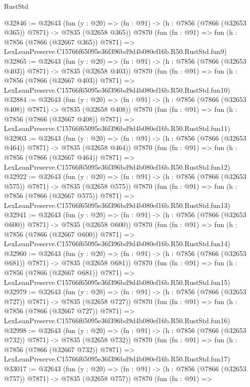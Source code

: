 \begin{lexlean}{RustStd}
\begin{coremodule}
@32846 := @32643
    (fun (y : @20) => (fn : @91) -> (h : @7856 (@7866 (@32653 @365)) @7871) -> @7835 (@32658 @365))
    @7870
    (fun (fn : @91) =>
    fun (h : @7856 (@7866 (@32667 @365)) @7871) =>
    LexLeanPreserve.C15766f65095e36f396bd9d4b080ef16b.R50.RustStd.fun9)
@32865 := @32643
    (fun (y : @20) => (fn : @91) -> (h : @7856 (@7866 (@32653 @403)) @7871) -> @7835 (@32658 @403))
    @7870
    (fun (fn : @91) =>
    fun (h : @7856 (@7866 (@32667 @403)) @7871) =>
    LexLeanPreserve.C15766f65095e36f396bd9d4b080ef16b.R50.RustStd.fun10)
@32884 := @32643
    (fun (y : @20) => (fn : @91) -> (h : @7856 (@7866 (@32653 @408)) @7871) -> @7835 (@32658 @408))
    @7870
    (fun (fn : @91) =>
    fun (h : @7856 (@7866 (@32667 @408)) @7871) =>
    LexLeanPreserve.C15766f65095e36f396bd9d4b080ef16b.R50.RustStd.fun11)
@32903 := @32643
    (fun (y : @20) => (fn : @91) -> (h : @7856 (@7866 (@32653 @464)) @7871) -> @7835 (@32658 @464))
    @7870
    (fun (fn : @91) =>
    fun (h : @7856 (@7866 (@32667 @464)) @7871) =>
    LexLeanPreserve.C15766f65095e36f396bd9d4b080ef16b.R50.RustStd.fun12)
@32922 := @32643
    (fun (y : @20) => (fn : @91) -> (h : @7856 (@7866 (@32653 @575)) @7871) -> @7835 (@32658 @575))
    @7870
    (fun (fn : @91) =>
    fun (h : @7856 (@7866 (@32667 @575)) @7871) =>
    LexLeanPreserve.C15766f65095e36f396bd9d4b080ef16b.R50.RustStd.fun13)
@32941 := @32643
    (fun (y : @20) => (fn : @91) -> (h : @7856 (@7866 (@32653 @600)) @7871) -> @7835 (@32658 @600))
    @7870
    (fun (fn : @91) =>
    fun (h : @7856 (@7866 (@32667 @600)) @7871) =>
    LexLeanPreserve.C15766f65095e36f396bd9d4b080ef16b.R50.RustStd.fun14)
@32960 := @32643
    (fun (y : @20) => (fn : @91) -> (h : @7856 (@7866 (@32653 @681)) @7871) -> @7835 (@32658 @681))
    @7870
    (fun (fn : @91) =>
    fun (h : @7856 (@7866 (@32667 @681)) @7871) =>
    LexLeanPreserve.C15766f65095e36f396bd9d4b080ef16b.R50.RustStd.fun15)
@32979 := @32643
    (fun (y : @20) => (fn : @91) -> (h : @7856 (@7866 (@32653 @727)) @7871) -> @7835 (@32658 @727))
    @7870
    (fun (fn : @91) =>
    fun (h : @7856 (@7866 (@32667 @727)) @7871) =>
    LexLeanPreserve.C15766f65095e36f396bd9d4b080ef16b.R50.RustStd.fun16)
@32998 := @32643
    (fun (y : @20) => (fn : @91) -> (h : @7856 (@7866 (@32653 @732)) @7871) -> @7835 (@32658 @732))
    @7870
    (fun (fn : @91) =>
    fun (h : @7856 (@7866 (@32667 @732)) @7871) =>
    LexLeanPreserve.C15766f65095e36f396bd9d4b080ef16b.R50.RustStd.fun17)
@33017 := @32643
    (fun (y : @20) => (fn : @91) -> (h : @7856 (@7866 (@32653 @757)) @7871) -> @7835 (@32658 @757))
    @7870
    (fun (fn : @91) =>

\end{coremodule}
\end{lexlean}
